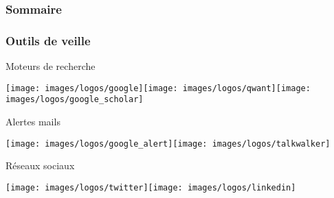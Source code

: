 \begin{frame}
	\frametitle{Sommaire}
	\tableofcontents
\end{frame}

\begin{frame}
	\frametitle{Outils de veille}
	\begin{itemize}
		\itemperso{}Moteurs de recherche\vspace*{.2cm}\newline%
		\rule{0pt}{0pt}\hfill\texttt{[image: images/logos/google]}\hspace{1cm}\texttt{[image: images/logos/qwant]}\hspace{1cm}\texttt{[image: images/logos/google\_scholar]}\hfill\rule{0pt}{0pt}
		\itemperso{}Alertes mails\vspace*{.2cm}\newline%
		\rule{0pt}{0pt}\hfill\texttt{[image: images/logos/google\_alert]}\hspace{1cm}\texttt{[image: images/logos/talkwalker]}\hfill\rule{0pt}{0pt}
		\itemperso{}Réseaux sociaux\vspace*{.2cm}\newline%
		\rule{0pt}{0pt}\hfill\texttt{[image: images/logos/twitter]}\hspace{1cm}\texttt{[image: images/logos/linkedin]}\hfill\rule{0pt}{0pt}
	\end{itemize}
\end{frame}